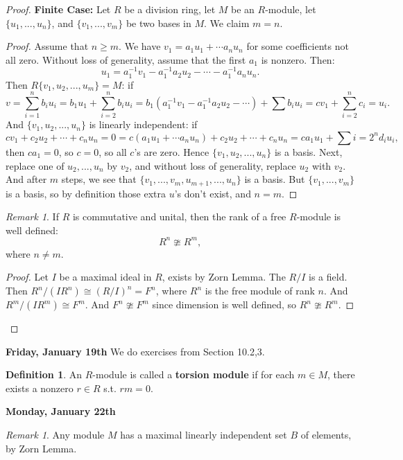 \documentclass[12pt]{amsbook}
\theoremstyle{plain}
\numberwithin{section}{chapter}
\numberwithin{equation}{chapter}
\theoremstyle{definition}
\newtheorem{Def}[theorem]{Definition}
\theoremstyle{remark}
\newtheorem{rem}[theorem]{Remark}
\renewcommand{\geq}{\geqslant}
\begin{document}
\begin{proof}
\textbf{Finite Case: } Let $R$ be a division ring, let $M$ be an $R$-module, let $\{u_1,...,u_n\}$, and $\{v_1,...,v_m\}$ be two bases in $M$. We claim $m = n$. 
\begin{proof}
Assume that $n \geq m$. We have $v_1 = a_1u_1 + \cdots a_nu_n$ for some coefficients not all zero. Without loss of generality, assume that the first $a_1$ is nonzero. Then:
$$
u_1 = a_1^{-1}v_1 - a_1^{-1}a_2u_2 - \cdots - a_1^{-1}a_nu_n.
$$
Then $R\{v_1,u_2,...,u_m\} = M$: if 
$$
v = \sum_{i = 1}^n b_i u_i = b_1u_1 + \sum_{i = 2}^n b_iu_i = b_1(a_1^{-1}v_1 - a_1^{-1}a_2u_2 - \cdots) + \sum b_i u_i = cv_1 + \sum_{i = 2}^n c_i = u_i.
$$
And $\{v_1,u_2,...,u_n\}$ is linearly independent: if 
$$
cv_1 + c_2u_2 + \cdots + c_nu_n = 0 = c(a_1u_1 + \cdots a_nu_n) + c_2u_2 + \cdots + c_nu_n = ca_1 u_1 + \sum{i = 2}^n d_iu_i,
$$
then $ca_1 = 0$, so $c = 0$, so all $c$'s are zero. Hence $\{v_1,u_2,...,u_n\}$ is a basis. Next, replace one of $u_2,...,u_n$ by $v_2$, and without loss of generality, replace $u_2$ with $v_2$. And after $m$ steps, we see that $\{v_1,...,v_m,u_{m + 1},...,u_n\}$ is a basis. But $\{v_1,...,v_m\}$ is a basis, so by definition those extra $u$'s don't exist, and $n = m$. 
\end{proof}
\begin{rem}
If $R$ is commutative and unital, then the rank of a free $R$-module is well defined: 
$$
R^n \ncong R^m,
$$
where $n \neq m$. 
\end{rem}
\begin{proof}
Let $I$ be a maximal ideal in $R$, exists by Zorn Lemma. The $R/I$ is a field. Then $R^n/(IR^n) \cong (R/I)^n = F^n$, where $R^n$ is the free module of rank $n$. And $R^m/(IR^m) \cong F^m$. And $F^n \ncong F^m$ since dimension is well defined, so $R^n \ncong R^m$. 
\end{proof}
\end{proof}

\textbf{Friday, January 19th}
\vspace{5mm}
We do exercises from Section 10.2,3. 

\begin{Def}
An $R$-module is called a \textbf{torsion module} if for each $m \in M$, there exists a nonzero $r \in R$ s.t. $rm = 0$. 
\end{Def}


\textbf{Monday, January 22th}
\vspace{5mm}

\begin{rem}
Any module $M$ has a maximal linearly independent set $B$ of elements, by Zorn Lemma. 
\end{rem}
\end{document}
